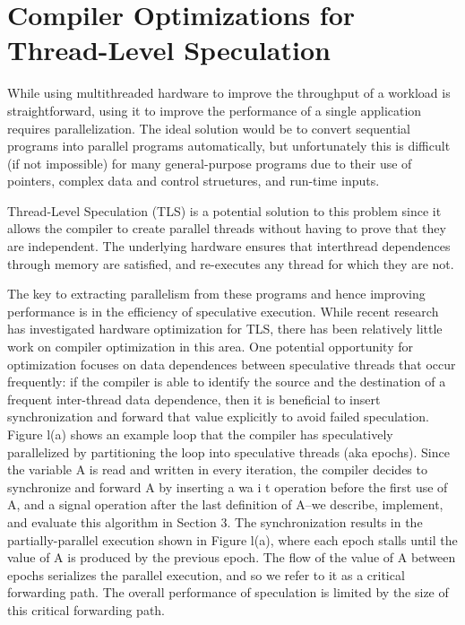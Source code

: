 \newpage 

\section{Compiler Optimizations for Thread-Level Speculation \cite{zhai2002compiler} }
 While using  multithreaded hardware to improve the throughput of a
workload is straightforward, using it to improve the performance
of a single application requires parallelization. The ideal solution
would be to convert sequential programs into parallel programs automatically, but unfortunately this is difficult (if not impossible) for
many general-purpose programs due to their use of pointers, complex data and control struetures, and run-time inputs.


Thread-Level Speculation (TLS) is a potential solution to this problem since it allows the
compiler to create parallel threads without having to prove that
they are independent. The underlying hardware ensures that interthread dependences through memory are satisfied, and re-executes
any thread for which they are not.

The key to extracting parallelism from these programs and hence
improving performance is in the efficiency of speculative execution. While recent research has investigated hardware optimization
for TLS, there has been relatively little work
on compiler optimization in this area. One potential opportunity
for optimization focuses on data dependences between speculative
threads that occur frequently: if the compiler is able to identify the
source and the destination of a frequent inter-thread data dependence,
then it is beneficial to insert synchronization and forward
that value explicitly to avoid failed speculation. Figure l(a) shows
an example loop that the compiler has speculatively parallelized by
partitioning the loop into speculative threads (aka epochs). Since
the variable A is read and written in every iteration,
the compiler decides to synchronize and forward A by inserting a wa i t operation
before the first use of A, and a signal operation after the last definition of A--we describe, implement, and evaluate this algorithm
in Section 3. The synchronization results in the partially-parallel
execution shown in Figure l(a), where each epoch stalls until the
value of A is produced by the previous epoch. The flow of the value
of A between epochs serializes the parallel execution, and so we refer to it as a critical forwarding path.
The overall performance of speculation is limited by the size of
this critical forwarding path.

